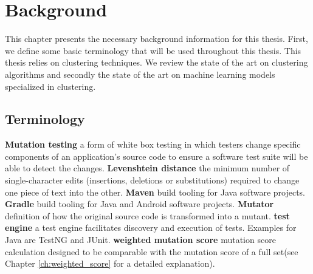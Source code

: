 \documentclass[../main]{subfiles}
\begin{document}
\chapter{Background}
\label{ch:background}
This chapter presents the necessary background information for this thesis. First, we define some basic terminology that will be used throughout this thesis.
This thesis relies on clustering techniques.
We review the state of the art on clustering algorithms and secondly the state of the art on machine learning models specialized in clustering.

\section{Terminology}
\textbf{Mutation testing}
a form of white box testing in which testers change specific components of an application's source code to ensure a software test suite will be able to detect the changes.
\textbf{Levenshtein distance} the minimum number of single-character edits (insertions, deletions or substitutions) required to change one piece of text into the other.
\textbf{Maven} build tooling for Java software projects.
\textbf{Gradle} build tooling for Java and Android software projects.
\textbf{Mutator} definition of how the original source code is transformed into a mutant.
\textbf{test engine} a test engine facilitates discovery and execution of tests. Examples for Java are TestNG and JUnit.
\textbf{weighted mutation score} mutation score calculation designed to be comparable with the mutation score of a full set(see Chapter \ref{ch:weighted_score} for a detailed explanation).
\end{document}
